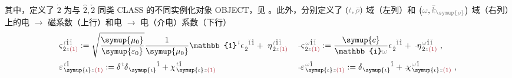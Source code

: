 其中，定义了 $\dot{2}$ 为与 $\hat{2},\check{2}$ 同类 CLASS 的不同实例化对象 OBJECT，见 。此外，分别定义了 $\left( \mathcolor{gray}{t}, \mathcolor{gray}{\bar{\rho}} \right)$ 域（左列）和 $\left( \mathcolor{gray}{\omega}, \mathcolor{gray}{\bar{k}_{\symup{\rho}}} \right)$ 域（右列）上的\textcolor{NavyBlue}{电 $\to$ 磁}系数（上行）和\textcolor{NavyBlue}{电 $\to$ 电}（介电）系数（下行）
\begin{subequations}
	\belowdisplayskip=8pt
\begin{align}
	&\varsigma^{\;\! \mathcolor{gray}{t} \hat{1} \mathcolor{gray}{\check{1}}}_{\;\! \dot{2} \mathcolor{gray}{z} \textcolor{Maroon}{(1)}} := \sqrt{\frac{\symup{\mu_0}}{\symup{\varepsilon_0}}} \frac{1}{\symup{\mu_0}} \mathbb{1}^{\;\! \mathcolor{gray}{t}} \epsilon^{\;\! \hphantom{\dot{2}} \mathcolor{gray}{\check{1}} \hat{1}}_{\;\! \dot{2}} + ~\eta^{\;\! \mathcolor{gray}{t} \hat{1} \mathcolor{gray}{\check{1}}}_{\;\! \dot{2} \mathcolor{gray}{z} \textcolor{Maroon}{(1)}}
	&&\Xint{\begin{smallmatrix} ~ \\ {}^{}_{\mathcolor{gray}{-}} \\ ~ \end{smallmatrix}}{13}{\varsigma}^{\;\! \mathcolor{gray}{\omega} \hat{1} \mathcolor{gray}{\check{1}}}_{\;\! \dot{2} \mathcolor{gray}{z} \textcolor{Maroon}{(1)}} := \frac{\symup{c}}{\mathbb{i} \mathcolor{gray}{\omega}} \epsilon^{\;\! \hphantom{\dot{2}} \mathcolor{gray}{\check{1}} \hat{1}}_{\;\! \dot{2}} + \Xint{\begin{smallmatrix} ~ \\ {}^{}_{\mathcolor{gray}{-}} \\ ~ \end{smallmatrix}}{17}{\eta}^{\;\! \mathcolor{gray}{\omega} \hat{1} \mathcolor{gray}{\check{1}}}_{\;\! \dot{2} \mathcolor{gray}{z} \textcolor{Maroon}{(1)}}~, \label{eq:varsigma_rho} \\
	&\varepsilon^{\;\! \mathcolor{gray}{t} \hat{1}}_{\;\! \symup{\iota} \mathcolor{gray}{z} \textcolor{Maroon}{(1)}} := \delta^{\;\! \mathcolor{gray}{t}} \delta^{\;\! \hphantom{\symup{\iota}} \hat{1}}_{\;\! \symup{\iota} \hphantom{z}} + \chi^{\;\! \mathcolor{gray}{t} \hat{1}}_{\;\! \symup{\iota} \mathcolor{gray}{z} \textcolor{Maroon}{(1)}}
	&&\Xint{\begin{smallmatrix} ~ \\ {}^{}_{\mathcolor{gray}{-}} \\ ~ \end{smallmatrix}}{16}{\varepsilon}^{\;\! \mathcolor{gray}{\omega} \hat{1}}_{\;\! \symup{\iota} \mathcolor{gray}{z} \textcolor{Maroon}{(1)}} := \delta^{\;\! \hphantom{\symup{\iota}} \hat{1}}_{\;\! \symup{\iota} \hphantom{z}} + \Xint{{}^{}_{\mathcolor{gray}{-}}}{23}{\chi}^{\;\! \mathcolor{gray}{\omega} \hat{1}}_{\;\! \symup{\iota} \mathcolor{gray}{z} \textcolor{Maroon}{(1)}}~, \label{eq:varepsilon_rho}
\end{align}
\end{subequations}
